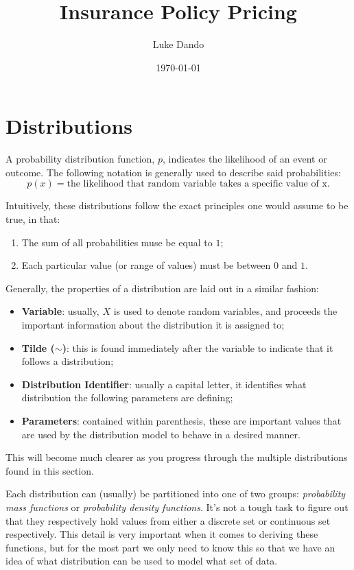 \documentclass{article}
\title{Insurance Policy Pricing}
\author{Luke Dando}
\date{\today}
\begin{document}
\maketitle
\tableofcontents
\pagebreak
{}


\section{Distributions}
A probability distribution function, $p$, indicates the likelihood of an event or outcome. The following notation is generally used to describe said probabilities:
\begin{equation}
    p(x) = \text{the likelihood that random variable takes a specific value of x}.
\end{equation}

Intuitively, these distributions follow the exact principles one would assume to be true, in that:
\begin{enumerate}
    \item The sum of all probabilities muse be equal to $1$;
    \item Each particular value (or range of values) must be between $0$ and $1$.
\end{enumerate}

Generally, the properties of a distribution are laid out in a similar fashion:
\begin{itemize}
    \item \textbf{Variable}: usually, $X$ is used to denote random variables, and proceeds the important information about the distribution it is assigned to;
    \item \textbf{Tilde ($\mathbf{\sim}$)}: this is found immediately after the variable to indicate that it follows a distribution;
    \item \textbf{Distribution Identifier}: usually a capital letter, it identifies what distribution the following parameters are defining;
    \item \textbf{Parameters}: contained within parenthesis, these are important values that are used by the distribution model to behave in a desired manner.
\end{itemize}
This will become much clearer as you progress through the multiple distributions found in this section.

Each distribution can (usually) be partitioned into one of two groups: \textit{probability mass functions} or \textit{probability density functions}. It's not a tough task to figure out that they respectively hold values from either a discrete set or continuous set respectively. This detail is very important when it comes to deriving these functions, but for the most part we only need to know this so that we have an idea of what distribution can be used to model what set of data. 
\end{document}
